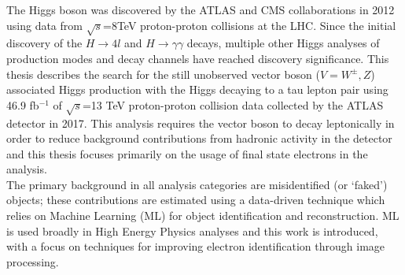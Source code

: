 
The Higgs boson was discovered by the ATLAS and CMS collaborations in 2012 using data from $\sqrt{s}$=8TeV proton-proton collisions at the LHC. Since the initial discovery of the $H\rightarrow 4l$ and $H\rightarrow \gamma\gamma$ decays, multiple other Higgs analyses of production modes and decay channels have reached discovery significance. This thesis describes the search for the still unobserved vector boson ($V=W^{\pm},Z$) associated Higgs production with the Higgs decaying to a tau lepton pair using 46.9 fb$^{-1}$ of $\sqrt{s}$=13 TeV proton-proton collision data collected by the ATLAS detector in 2017. This analysis requires the vector boson to decay leptonically in order to reduce background contributions from hadronic activity in the detector and this thesis focuses primarily on the usage of final state electrons in the analysis.\\

The primary background in all analysis categories are misidentified (or `faked') objects; these contributions are estimated using a data-driven technique which relies on Machine Learning (ML) for object identification and reconstruction. ML is used broadly in High Energy Physics analyses and this work is introduced, with a focus on techniques for improving electron identification through image processing.